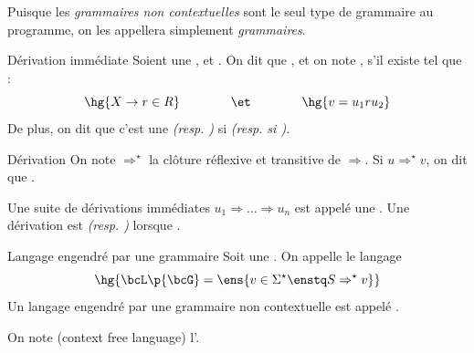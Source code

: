     Puisque les \emph{grammaires non contextuelles} sont le seul type de grammaire au programme, on les appellera simplement \emph{grammaires}.
    
    \begin{definition}{Dérivation immédiate}{}
        Soient  une ,  et . On dit que , et on note , s'il existe  tel que :
        \[ \hg{X \rightarrow r \in R} \qquad\qquad\et\qquad\qquad \hg{v = u_1 r u_2}\]
        De plus, on dit que c'est une  \emph{(resp. )} si  \emph{(resp. si )}.
    \end{definition}
    
    \begin{definition}{Dérivation}{}
        On note $\Rightarrow^\star$ la clôture réflexive et transitive de $\Rightarrow$. Si $u \Rightarrow^\star v$, on dit que .
        
        Une suite de dérivations immédiates $u_1 \Rightarrow \dots \Rightarrow u_n$ est appelé une .
        Une dérivation est  \emph{(resp. )} lorsque  .
    \end{definition}
    
    \begin{definition}{Langage engendré par une grammaire}{}
        Soit  une . On appelle  le langage 
        \[ \hg{\bcL\p{\bcG} = \ens{v \in \Sigma^\star \enstq S \Rightarrow^\star v }}\]
        Un langage engendré par une grammaire non contextuelle est appelé .
    \end{definition}
    \begin{notation}
        On note \hg{$\CFL_\Sigma$} (context free language) l'.  
    \end{notation}
    
